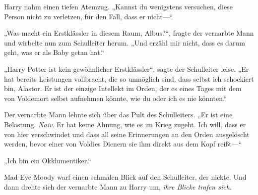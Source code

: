 Harry nahm einen tiefen Atemzug. „Kannst du wenigstens versuchen, diese Person nicht zu verletzen, für den Fall, dass er nicht—“

„Was macht ein Erstklässler in diesem Raum, Albus?“, fragte der vernarbte Mann und wirbelte nun zum Schulleiter herum. „Und erzähl mir nicht, dass es darum geht, was er als Baby getan hat.“

„Harry Potter ist kein gewöhnlicher Erstklässler“, sagte der Schulleiter leise. „Er hat bereits Leistungen vollbracht, die so unmöglich sind, dass selbst ich schockiert bin, Alastor. Er ist der einzige Intellekt im Orden, der es eines Tages mit dem von Voldemort selbst aufnehmen könnte, wie du oder ich es nie könnten.“

Der vernarbte Mann lehnte sich über das Pult des Schulleiters. „Er ist eine Belastung. \emph{Naiv}. Er hat keine Ahnung, wie es im Krieg zugeht. Ich will, dass er von hier verschwindet und dass all seine Erinnerungen an den Orden ausgelöscht werden, bevor einer von Voldies Dienern sie ihm direkt aus dem Kopf reißt—“

„Ich bin ein Okklumentiker.“


Mad-Eye Moody warf einen schmalen Blick auf den Schulleiter, der nickte. Und dann drehte sich der vernarbte Mann zu Harry um, \emph{ihre Blicke trafen sich.}


